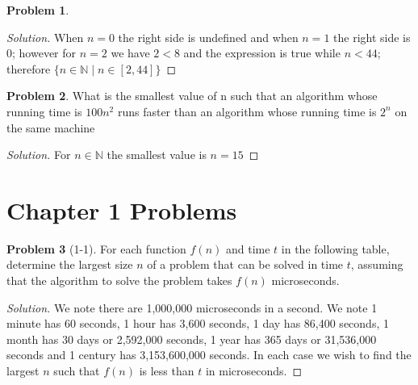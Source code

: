 \documentclass[oneside]{book}
\theoremstyle{definition}
\newtheorem{problem}{Problem}[section]
\theoremstyle{plain}
\begin{document}
\begin{spacing}{1.618}
\begin{problem}
\begin{proof}[Solution]
		When $n=0$ the right side is undefined and when $n=1$ the right side is 0; however for $n=2$ we have $2<8$ and the expression is true while $n<44$; therefore $\{n\in\mathbb{N}\mid n\in[2, 44]\}$
	\end{proof}
\end{problem}

\begin{problem}
	What is the smallest value of n such that an algorithm whose running time is $100n^2$ runs faster than an algorithm whose running time is $2^n$ on the same machine
	\begin{proof}[Solution]
		For $n\in \mathbb{N}$ the smallest value is $n=15$
	\end{proof}	
\end{problem}

\section{Chapter 1 Problems}

\begin{problem}[1-1]
	For each function $f(n)$ and time $t$ in the following table, determine the largest size $n$ of a problem that can be solved in time $t$, assuming that the algorithm to solve the problem takes $f(n)$ microseconds. 
	\begin{proof}[Solution]
		We note there are 1,000,000 microseconds in a second. We note 1 minute has 60 seconds, 1 hour has 3,600 seconds, 1 day has 86,400 seconds, 1 month has 30 days or 2,592,000 seconds, 1 year has 365 days or 31,536,000 seconds and 1 century has   3,153,600,000 seconds. In each case we wish to find the largest $n$ such that $f(n)$ is less than $t$ in microseconds. 
		

\end{proof}
\end{problem}
\end{spacing}
\end{document}
